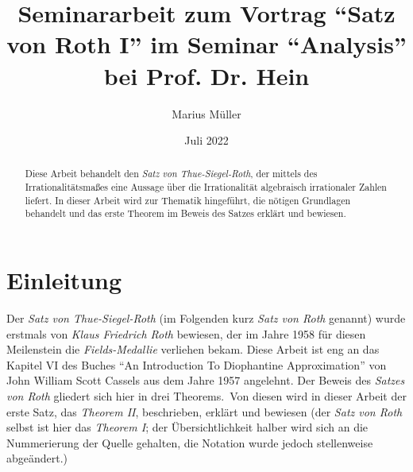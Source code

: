 \documentclass[11pt]{article}
\title{Seminararbeit zum Vortrag ``Satz von Roth I'' im Seminar ``Analysis'' bei Prof. Dr. Hein}
\author{Marius Müller}
\date{Juli 2022}
\begin{document}
    \maketitle

    \vfill

    \begin{abstract}
        \textrm{Diese Arbeit behandelt den \emph{Satz von Thue-Siegel-Roth}, der mittels des Irrationalitätsmaßes eine
        Aussage über die Irrationalität algebraisch irrationaler Zahlen liefert.
        \newline
        In dieser Arbeit wird zur Thematik hingeführt, die nötigen Grundlagen behandelt und das erste Theorem im Beweis
        des Satzes erklärt und bewiesen.}
    \end{abstract}

    \newpage

    \tableofcontents

    \newpage

    \section{Einleitung}
    \label{sec:intro}
        \textrm{Der \emph{Satz von Thue-Siegel-Roth} (im Folgenden kurz \emph{Satz von Roth} genannt) wurde erstmals von
        \emph{Klaus Friedrich Roth} bewiesen, der im Jahre 1958 für diesen Meilenstein die \emph{Fields-Medallie}
        verliehen bekam.
        \newline
        Diese Arbeit ist eng an das Kapitel VI des Buches ``An Introduction To Diophantine Approximation'' von
        John William Scott Cassels aus dem Jahre 1957 angelehnt.
        \newline
        Der Beweis des \emph{Satzes von Roth} gliedert sich hier in drei Theorems.\ Von diesen wird in dieser
        Arbeit der erste Satz, das \emph{Theorem II}, beschrieben, erklärt und bewiesen (der \emph{Satz von Roth} selbst
        ist hier das \emph{Theorem I}; der Übersichtlichkeit halber wird sich an die Nummerierung der Quelle gehalten,
        die Notation wurde jedoch stellenweise abgeändert.)}

    
    
    

    
        
\end{document}
